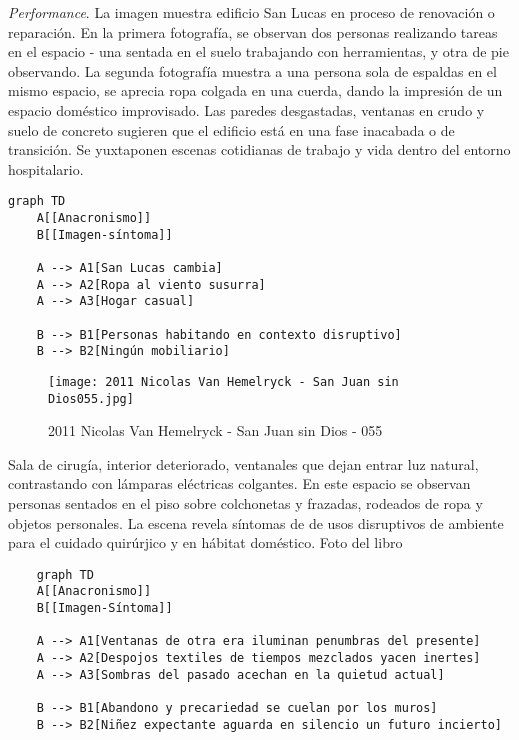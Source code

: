 \textit{Performance}. La imagen muestra edificio San Lucas en proceso de renovación o reparación. En la primera fotografía, se observan dos personas realizando tareas en el espacio - una sentada en el suelo trabajando con herramientas, y otra de pie observando. La segunda fotografía muestra a una persona sola de espaldas en el mismo espacio, se aprecia ropa colgada en una cuerda, dando la impresión de un espacio doméstico improvisado. Las paredes desgastadas, ventanas en crudo y suelo de concreto sugieren que el edificio está en una fase inacabada o de transición. Se yuxtaponen  escenas cotidianas de trabajo y vida dentro del entorno hospitalario.

\small
\singlespacing \begin{verbatim}
graph TD
    A[[Anacronismo]]
    B[[Imagen-síntoma]]

    A --> A1[San Lucas cambia]
    A --> A2[Ropa al viento susurra]
    A --> A3[Hogar casual]

    B --> B1[Personas habitando en contexto disruptivo]
    B --> B2[Ningún mobiliario]
\end{verbatim}
\normalsize

\clearpage
\begin{figure}[h!]
    \centering
    \texttt{[image: 2011 Nicolas Van Hemelryck - San Juan sin Dios055.jpg]}
    \caption{2011 Nicolas Van Hemelryck - San Juan sin Dios - 055}
    \label{fig:2011NicolasVanHemelryckSanJuansinDios-055}
\end{figure}

Sala de cirugía, interior deteriorado, ventanales que dejan entrar luz natural, contrastando con lámparas eléctricas colgantes. En este espacio se observan personas sentados en el piso sobre colchonetas y frazadas, rodeados de ropa y objetos personales. La escena revela síntomas de de usos disruptivos de ambiente para el cuidado quirúrjico y en hábitat doméstico. Foto del libro \parencite{Hemelryck2011}

\small
\singlespacing \begin{verbatim}
    graph TD
    A[[Anacronismo]]
    B[[Imagen-Síntoma]]

    A --> A1[Ventanas de otra era iluminan penumbras del presente]
    A --> A2[Despojos textiles de tiempos mezclados yacen inertes]
    A --> A3[Sombras del pasado acechan en la quietud actual]

    B --> B1[Abandono y precariedad se cuelan por los muros]
    B --> B2[Niñez expectante aguarda en silencio un futuro incierto]

\end{verbatim}
\normalsize


